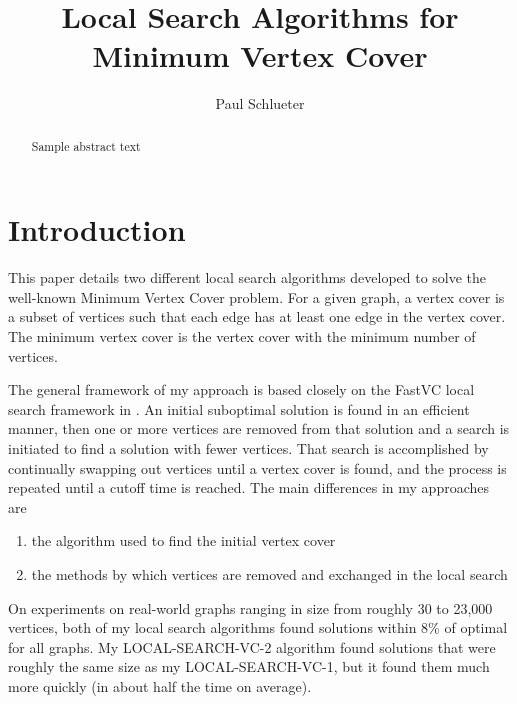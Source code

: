\documentclass[sigconf]{acmart}
\begin{document}
\title{Local Search Algorithms for Minimum Vertex Cover}

\author{Paul Schlueter}

\begin{abstract}
Sample abstract text
\end{abstract}


\maketitle
 
\section{Introduction} \label{sec:intro}
This paper details two different local search algorithms developed to solve the well-known Minimum Vertex Cover problem. For a given graph, a vertex cover is a subset of vertices such that each edge has at least one edge in the vertex cover. The minimum vertex cover is the vertex cover with the minimum number of vertices. 

The general framework of my approach is based closely on the FastVC local search framework in \cite{cai2015fastvc}. An initial suboptimal solution is found in an efficient manner, then one or more vertices are removed from that solution and a search is initiated to find a solution with fewer vertices. That search is accomplished by continually swapping out vertices until a vertex cover is found, and the process is repeated until a cutoff time is reached. The main differences in my approaches are
\begin{enumerate}
	\item the algorithm used to find the initial vertex cover
	\item the methods by which vertices are removed and exchanged in the local search
\end{enumerate}

On experiments on real-world graphs ranging in size from roughly 30 to 23,000 vertices, both of my local search algorithms found solutions within 8\% of optimal for all graphs. My LOCAL-SEARCH-VC-2 algorithm found solutions that were roughly the same size as my LOCAL-SEARCH-VC-1, but it found them much more quickly (in about half the time on average).
\end{document}
